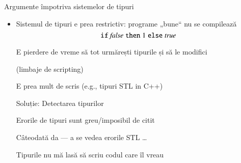 \documentclass[xcolor=pdftex,romanian,colorlinks]{beamer}
\begin{document}
\begin{frame}{Argumente împotriva sistemelor de tipuri}
\begin{itemize}
  \item<2-> Sistemul de tipuri e prea restrictiv: programe „bune“ nu se compilează
      \[\mathrel{\text{\ttfamily if}} {{\it false}} \mathrel{\text{\ttfamily then}} 1 \mathrel{\text{\ttfamily else}} {{\it true}}\]

   E pierdere de vreme să tot urmărești tipurile și să le modifici
     
     (limbaje de scripting)

   E prea mult de scris (e.g., tipuri STL in C++)
    
    Soluție:  Detectarea tipurilor

   Erorile de tipuri sunt greu/imposibil de citit

     Câteodată da --- a se vedea erorile STL \ldots

   Tipurile nu mă lasă să scriu codul care îl vreau
\end{itemize}
\end{frame}
\end{document}
